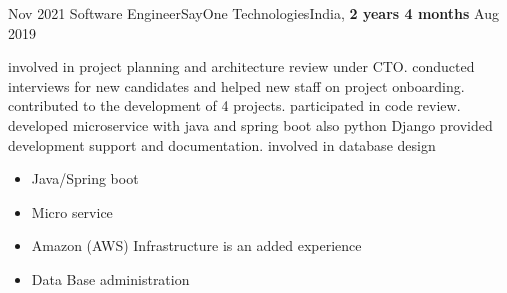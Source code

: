 \begin{experiences}
  \experience
  {Nov 2021}   {Software Engineer}{SayOne Technologies}{India,  \textbf{ 2 years 4 months}}
  {Aug 2019}   {
    involved in project planning and architecture review under CTO.
    conducted interviews for new candidates and helped new staff on project onboarding.
    contributed to the development of 4 projects.
    participated in code review.
    developed microservice with java and spring boot also python Django
    provided development support and documentation. 
    involved in database design
                      \begin{itemize}
                        \item Java/Spring boot 
                        \item Micro service 
                        \item Amazon (AWS) Infrastructure is an added experience
                        \item Data Base administration           

\end{itemize}}
\end{experiences}
